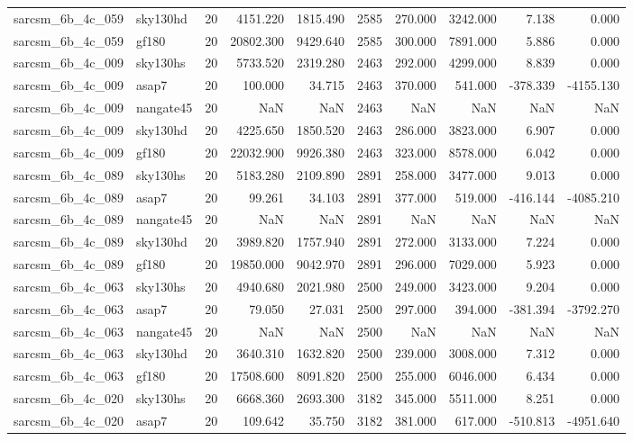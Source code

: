 \begin{longtable}{llrrrrrrrr}
sarcsm\_6b\_4c\_059 & sky130hd & 20 & 4151.220 & 1815.490 & 2585 & 270.000 & 3242.000 & 7.138 & 0.000 \\
sarcsm\_6b\_4c\_059 & gf180 & 20 & 20802.300 & 9429.640 & 2585 & 300.000 & 7891.000 & 5.886 & 0.000 \\
sarcsm\_6b\_4c\_009 & sky130hs & 20 & 5733.520 & 2319.280 & 2463 & 292.000 & 4299.000 & 8.839 & 0.000 \\
sarcsm\_6b\_4c\_009 & asap7 & 20 & 100.000 & 34.715 & 2463 & 370.000 & 541.000 & -378.339 & -4155.130 \\
sarcsm\_6b\_4c\_009 & nangate45 & 20 & NaN & NaN & 2463 & NaN & NaN & NaN & NaN \\
sarcsm\_6b\_4c\_009 & sky130hd & 20 & 4225.650 & 1850.520 & 2463 & 286.000 & 3823.000 & 6.907 & 0.000 \\
sarcsm\_6b\_4c\_009 & gf180 & 20 & 22032.900 & 9926.380 & 2463 & 323.000 & 8578.000 & 6.042 & 0.000 \\
sarcsm\_6b\_4c\_089 & sky130hs & 20 & 5183.280 & 2109.890 & 2891 & 258.000 & 3477.000 & 9.013 & 0.000 \\
sarcsm\_6b\_4c\_089 & asap7 & 20 & 99.261 & 34.103 & 2891 & 377.000 & 519.000 & -416.144 & -4085.210 \\
sarcsm\_6b\_4c\_089 & nangate45 & 20 & NaN & NaN & 2891 & NaN & NaN & NaN & NaN \\
sarcsm\_6b\_4c\_089 & sky130hd & 20 & 3989.820 & 1757.940 & 2891 & 272.000 & 3133.000 & 7.224 & 0.000 \\
sarcsm\_6b\_4c\_089 & gf180 & 20 & 19850.000 & 9042.970 & 2891 & 296.000 & 7029.000 & 5.923 & 0.000 \\
sarcsm\_6b\_4c\_063 & sky130hs & 20 & 4940.680 & 2021.980 & 2500 & 249.000 & 3423.000 & 9.204 & 0.000 \\
sarcsm\_6b\_4c\_063 & asap7 & 20 & 79.050 & 27.031 & 2500 & 297.000 & 394.000 & -381.394 & -3792.270 \\
sarcsm\_6b\_4c\_063 & nangate45 & 20 & NaN & NaN & 2500 & NaN & NaN & NaN & NaN \\
sarcsm\_6b\_4c\_063 & sky130hd & 20 & 3640.310 & 1632.820 & 2500 & 239.000 & 3008.000 & 7.312 & 0.000 \\
sarcsm\_6b\_4c\_063 & gf180 & 20 & 17508.600 & 8091.820 & 2500 & 255.000 & 6046.000 & 6.434 & 0.000 \\
sarcsm\_6b\_4c\_020 & sky130hs & 20 & 6668.360 & 2693.300 & 3182 & 345.000 & 5511.000 & 8.251 & 0.000 \\
sarcsm\_6b\_4c\_020 & asap7 & 20 & 109.642 & 35.750 & 3182 & 381.000 & 617.000 & -510.813 & -4951.640 \\

\end{longtable}
